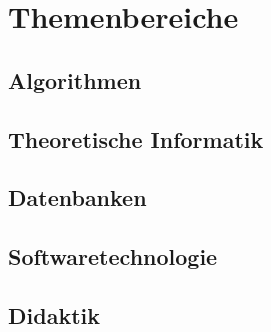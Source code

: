 \chapter{Themenbereiche}
\section{Algorithmen}
\section{Theoretische Informatik}
\section{Datenbanken}
\section{Softwaretechnologie}
\section{Didaktik}
